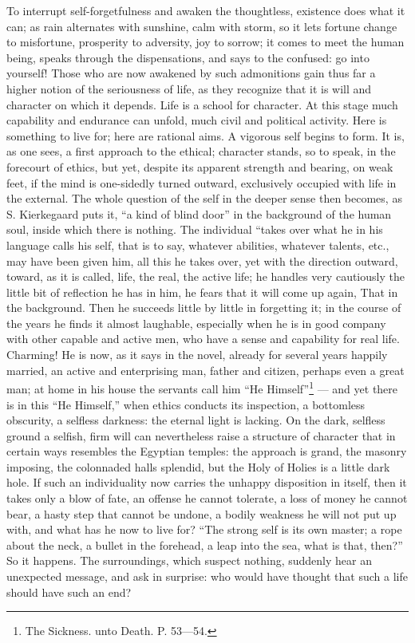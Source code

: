 \documentclass[12pt,a4paper,openany]{book}
\newcommand{\opage}[1]{\marginnote{\footnotesize\textit{[#1]}}}
\begin{document}
To interrupt self-forgetfulness and awaken the thoughtless, existence does what it can; as rain alternates with sunshine, calm with storm, so it lets fortune change to misfortune, prosperity to adversity, joy to sorrow; it comes to meet the human being, speaks through the dispensations, and says to the confused: go into yourself! Those who are now awakened by such admonitions gain thus far a higher notion of the seriousness of life, as they recognize that it is will and character on which
\setcounter{footnote}{0}%
\opage{703}it depends. Life is a school for character. At this stage much capability and endurance can unfold, much civil and political activity. Here is something to live for; here are rational aims. A vigorous self begins to form. It is, as one sees, a first approach to the ethical; character stands, so to speak, in the forecourt of ethics, but yet, despite its apparent strength and bearing, on weak feet, if the mind is one-sidedly turned outward, exclusively occupied with life in the external. The whole question of the self in the deeper sense then becomes, as S. Kierkegaard puts it, ``a kind of blind door'' in the background of the human soul, inside which there is nothing. The individual ``takes over what he in his language calls his self, that is to say, whatever abilities, whatever talents, etc., may have been given him, all this he takes over, yet with the direction outward, toward, as it is called, life, the real, the active life; he handles very cautiously the little bit of reflection he has in him, he fears that it will come up again, That in the background. Then he succeeds little by little in forgetting it; in the course of the years he finds it almost laughable, especially when he is in good company with other capable and active men, who have a sense and capability for real life. Charming! He is now, as it says in the novel, already for several years happily married, an active and enterprising man, father and citizen, perhaps even a great man; at home in his house the servants call him ``He Himself''\footnote[1]{The Sickness. unto Death. P. 53---54.} --- and yet there is in this %
``He Himself,'' when ethics conducts its inspection,
\setcounter{footnote}{0}%
\opage{704}a bottomless obscurity, a selfless darkness: the eternal light is lacking. On the dark, selfless ground a selfish, firm will can nevertheless raise a structure of character that in certain ways resembles the Egyptian temples: the approach is grand, the masonry imposing, the colonnaded halls splendid, but the Holy of Holies is a little dark hole. If such an individuality now carries the unhappy disposition in itself, then it takes only a blow of fate, an offense he cannot tolerate, a loss of money he cannot bear, a hasty step that cannot be undone, a bodily weakness he will not put up with, and what has he now to live for? ``The strong self is its own master; a rope about the neck, a bullet in the forehead, a leap into the sea, what is that, then?'' %
So it happens. The surroundings, which suspect nothing, suddenly hear an unexpected message, and ask in surprise: who would have thought that such a life should have such an end?
\end{document}
